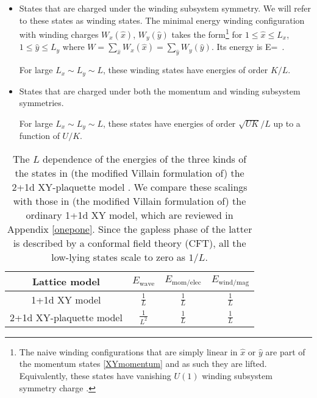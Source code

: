 \documentclass[12pt]{article}
\numberwithin{equation}{section}
\begin{document}
\begin{itemize}
	\item
	States that are charged under  the winding subsystem symmetry. We will refer to these states as winding states. The minimal energy winding configuration with winding charges $W_x(\hat x)$, $W_y(\hat y)$ takes the form\footnote{The naive winding configurations that are simply linear in $\hat x$ or $\hat y$ are part of the momentum states \eqref{XYmomentum} and as such they are lifted.  Equivalently, these states have vanishing $U(1)$ winding subsystem symmetry charge \cite{paper1,Rudelius:2020kta}. }
	\ie
	\pi{}
	\fe
	for $1\leq\hat x\leq L_x$, $1\leq\hat y\leq L_y$ where $W = \sum_{\hat x} W_x(\hat x)=\sum_{\hat y} W_y(\hat y)$.
	Its energy is
	\ie
	E=~.
	\fe
	
	For large $L_x\sim L_y\sim L$, these winding states have energies of order ${K}/{L}$.
	\item
	States that are charged under both the momentum and winding subsystem symmetries.
	
	For large $L_x\sim L_y\sim L$, these states have energies of order $\sqrt{UK}/L$ up to a function of $U/K$.
\end{itemize}

\begin{table}
\begin{center}
\begin{tabular}{|c|c|c|c|}
\hline
Lattice model & $E_\text{wave}$ & $E_\text{mom/elec}$ & $E_\text{wind/mag}$
\tabularnewline
\hline
1+1d XY model & $\frac{1}{L}$ & $\frac{1}{L}$ & $\frac{1}{L}$
\tabularnewline
\hline
2+1d XY-plaquette model & $\frac{1}{L^2}$ & $\frac{1}{L}$ & $\frac{1}{L}$
\tabularnewline
\hline
\end{tabular}
\caption{The $L$ dependence of the energies of the three kinds of the states in (the modified Villain formulation of) the 2+1d XY-plaquette model \cite{Gorantla:2021svj}.
We compare these scalings with those in  (the modified Villain formulation of) the ordinary 1+1d  XY model,   which are reviewed in Appendix \ref{onepone}.
Since the gapless phase of the latter is described by a conformal field theory (CFT), all the low-lying states scale to zero as $1/L$.
}  \label{tbl:lattice-energythr}
\end{center}
\end{table}
\end{document}
